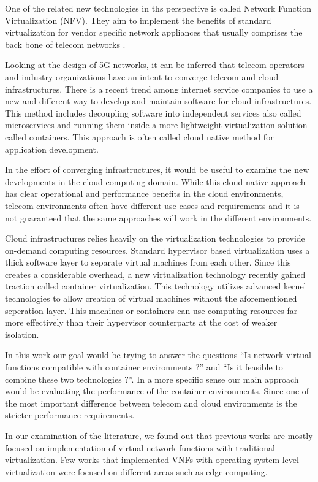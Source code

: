 \documentclass[12pt,oneandhalf,chaparabic,ceng,ms,eng,oneside,pntc]{gsufbe}
\begin{document}
One of the related new technologies in ths perspective is called Network Function Virtualization (NFV).
They aim to implement the benefits of standard virtualization for vendor specific network appliances that usually
comprises the back bone of telecom networks \cite{abdelwahab_network_2016}.

Looking at the design of 5G networks, it can be inferred that telecom operators and industry organizations
have an intent to converge telecom and cloud infrastructures.  There is a recent trend among internet
service companies to use a new and different way to develop and maintain
software for cloud infrastructures.  This method includes decoupling software into independent services
also called microservices and running them inside a more lightweight virtualization solution called
containers.  This approach is often called cloud native method for application development.

In the effort of converging infrastructures, it would be useful to examine the new developments in the
cloud computing domain. While this cloud native approach has clear operational and performance benefits
in the cloud environments, telecom environments often have different use cases and requirements and
it is not guaranteed that the same approaches will work in the different environments.

Cloud infrastructures relies heavily on the virtualization technologies to provide on-demand computing
resources. Standard hypervisor based virtualization uses a thick software layer to separate virtual
machines from each other. Since this creates a considerable overhead, a new virtualization
technology recently gained traction called container virtualization. This technology utilizes advanced
kernel technologies to allow creation of virtual machines without the aforementioned seperation layer.
This machines or containers can use computing resources far more effectively than their hypervisor
counterparts at the cost of weaker isolation.

In this work our goal would be trying to answer the questions ``Is network virtual functions
compatible with container environments ?'' and ``Is it feasible to combine these two technologies ?''.
In a more specific sense our main approach would be evaluating the performance of the container
environments. Since one of the most important difference between telecom and cloud environments is the
stricter performance requirements. 

In our examination of the literature, we found out that previous works are mostly focused on
implementation of virtual network functions with traditional virtualization.  Few works that implemented
VNFs with operating system level virtualization were focused on different areas such as edge 
computing.
\end{document}
